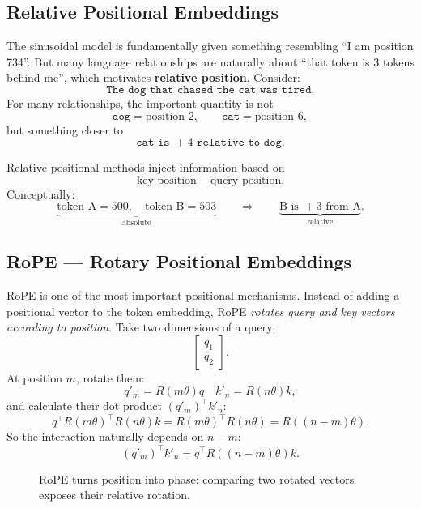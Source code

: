 \subsection{Relative Positional Embeddings}
\label{subsec:modern-relative-position}
The sinusoidal model is fundamentally given something resembling ``I am position 734''.
But many language relationships are naturally about ``that token is 3 tokens behind me'', which motivates \textbf{relative position}.
Consider:
\[
    \texttt{The dog that chased the cat was tired.}
\]
For many relationships, the important quantity is not
\[
    \texttt{dog}=\text{position }2,
    \qquad
    \texttt{cat}=\text{position }6,
\]
but something closer to
\[
    \texttt{cat is }+4\texttt{ relative to dog}.
\]

Relative positional methods inject information based on
\[
    \text{key position}-\text{query position}.
\]
Conceptually:
\[
    \underbrace{\text{token A}=500,\quad \text{token B}=503}_{\text{absolute}}
    \qquad\Longrightarrow\qquad
    \underbrace{\text{B is }+3\text{ from A}}_{\text{relative}}.
\]

\subsection{RoPE --- Rotary Positional Embeddings}
\label{subsec:modern-rope}
RoPE is one of the most important positional mechanisms.
Instead of adding a positional vector to the token embedding, RoPE \textit{rotates query and key vectors according to position}.
Take two dimensions of a query:
\[
    \begin{bmatrix}
    q_1\\q_2
    \end{bmatrix}.
\]
At position $m$, rotate them:
\[
    q'_m=R(m\theta)q \quad k'_n=R(n\theta)k,
\]
and calculate their dot product $(q'_m)^\top k'_n $:
\[
    q^\top R(m\theta)^\top R(n\theta)k 
    =
    R(m\theta)^\top R(n\theta)=R((n-m)\theta).
\]
So the interaction naturally depends on $n-m$:
\[
    (q'_m)^\top k'_n
    =
    q^\top R((n-m)\theta)k.
\]

\begin{figure}[htbp]
    \centering
    \caption{RoPE turns position into phase: comparing two rotated vectors exposes their relative rotation.}
    \label{fig:modern-rope-geometry}
\end{figure}

